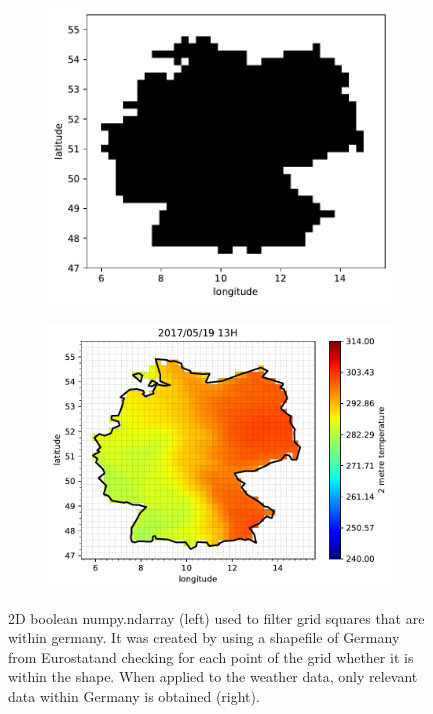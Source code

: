 \begin{figure}[h!]%
	\centering
	\begin{subfigure}{.5\textwidth}
		\centering
		\includegraphics[width=.85\textwidth]{plots/isinDE}%
		\label{fig:isinDE}%
	\end{subfigure}%
	\begin{subfigure}{.5\textwidth}
		\centering
		\includegraphics[width=1.1\textwidth]{plots/t2m/maxvar/0_map_isin}%
		\label{fig:t2m_maxvar_0_map_isin}%
	\end{subfigure}
	\caption[2D boolean numpy.ndarray (left) used to filter grid squares that are within Germany. It was created by using a shapefile of Germany from Eurostat and checking for each point of the grid if it is within the shapefile. When applied to the weather data, only relevant data within Germany is obtained (right).]
	{2D boolean numpy.ndarray (left) used to filter grid squares that are within germany. It was created by using a shapefile of Germany from Eurostat\footnotemark and checking for each point of the grid whether it is within the shape. When applied to the weather data, only relevant data within Germany is obtained (right).}
	\label{fig:isin_compare}
\end{figure}


